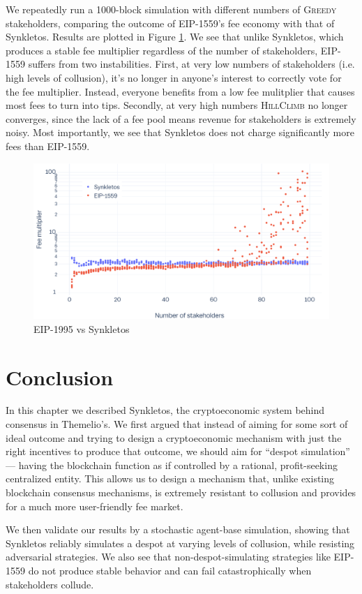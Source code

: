\documentclass[letterpaper,12pt,oneside]{article}
\begin{document}
We repeatedly run a 1000-block simulation with different numbers of \textsc{Greedy} stakeholders, comparing the outcome of EIP-1559's fee economy with that of Synkletos. Results are plotted in Figure \ref{eip}. We see that unlike Synkletos, which produces a stable fee multiplier regardless of the number of stakeholders, EIP-1559 suffers from two instabilities. First, at very low numbers of stakeholders (i.e. high levels of collusion), it's no longer in anyone's interest to correctly vote for the fee multiplier. Instead, everyone benefits from a low fee mulitplier that causes most fees to turn into tips. Secondly, at very high numbers \textsc{HillClimb} no longer converges, since the lack of a fee pool means revenue for stakeholders is extremely noisy. Most importantly, we see that Synkletos does not charge significantly more fees than EIP-1559.

\begin{figure}[!h]
    \centering
    \includegraphics[width=0.8\linewidth]{eip.png}
    \caption{EIP-1995 vs Synkletos}
    \label{eip}
\end{figure}

\section{Conclusion}

In this chapter we described Synkletos, the cryptoeconomic system behind consensus in Themelio's. We first argued that instead of aiming for some sort of ideal outcome and trying to design a cryptoeconomic mechanism with just the right incentives to produce that outcome, we should aim for ``despot simulation'' --- having the blockchain function as if controlled by a rational, profit-seeking centralized entity. This allows us to design a mechanism that, unlike existing blockchain consensus mechanisms, is extremely resistant to collusion and provides for a much more user-friendly fee market.

We then validate our results by a stochastic agent-base simulation, showing that Synkletos reliably simulates a despot at varying levels of collusion, while resisting adversarial strategies. We also see that non-despot-simulating strategies like EIP-1559 do not produce stable behavior and can fail catastrophically when stakeholders collude.
\end{document}
